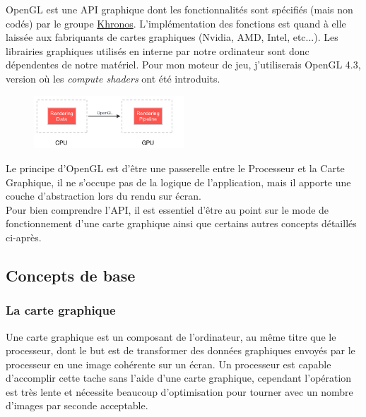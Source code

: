 \documentclass[a4paper,10pt]{report}
\begin{document}
OpenGL est une API graphique dont les fonctionnalités sont spécifiés (mais non codés) par le groupe \href{https://www.khronos.org/}{Khronos}. L'implémentation des fonctions est quand à elle laissée aux fabriquants de cartes graphiques (Nvidia, AMD, Intel, etc...). Les librairies graphiques utilisés en interne par notre ordinateur sont donc dépendentes de notre matériel.
Pour mon moteur de jeu, j'utiliserais OpenGL 4.3, version où les {\it compute shaders} ont été introduits.
\\
\begin{figure}
    \centering
    \includegraphics[width=0.5\textwidth]{OpenGL_purpose}
\end{figure}

Le principe d'OpenGL est d'être une passerelle entre le Processeur et la Carte Graphique, il ne s'occupe pas de la logique de l'application, mais il apporte une couche d'abstraction lors du rendu sur écran.
\\
Pour bien comprendre l'API, il est essentiel d'être au point sur le mode de fonctionnement d'une carte graphique ainsi que certains autres concepts détaillés ci-après.

\subsection{Concepts de base}
\subsubsection{La carte graphique}
Une carte graphique est un composant de l'ordinateur, au même titre que le processeur, dont le but est de transformer des données graphiques envoyés par le processeur en une image cohérente sur un écran. Un processeur est capable d'accomplir cette tache sans l'aide d'une carte graphique, cependant l'opération est très lente et nécessite beaucoup d'optimisation pour tourner avec un nombre d'images par seconde acceptable.
\end{document}
